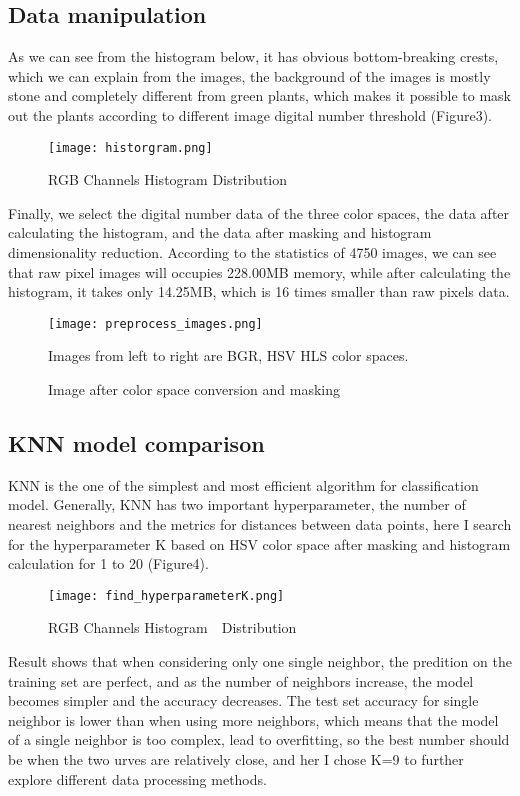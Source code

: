 \documentclass[12pt]{article}
\begin{document}
\subsection{Data manipulation}
As we can see from the histogram below, it has obvious bottom-breaking crests, which we can explain from the images, the background of the images is mostly stone and completely different from green plants, which makes it possible to mask out the plants according to different image digital number threshold (Figure3).
\begin{center}
\begin{figure}[htb]
\centering 
\texttt{[image: historgram.png]}
\caption{RGB Channels Histogram Distribution}
\end{figure}
\end{center}
Finally, we select the digital number data of the three color spaces, the data after calculating the histogram, and the data after masking and histogram dimensionality reduction. According to the statistics of 4750 images, we can see that raw pixel images will occupies 228.00MB memory, while after calculating the histogram, it takes only 14.25MB, which is 16 times smaller than raw pixels data.
\begin{center}
\begin{figure}[htb]
\centering 
\texttt{[image: preprocess\_images.png]}
\caption{Image after color space conversion and masking}
Images from left to right are BGR, HSV HLS color spaces.
\end{figure}
\end{center}

\subsection{KNN model comparison}
KNN is the one of the simplest and most efficient algorithm for classification model. Generally, KNN has two important hyperparameter, the number of nearest neighbors and the metrics for distances between data points, here I search for the hyperparameter K based on HSV color space after masking and histogram calculation for 1 to 20 (Figure4). 
\begin{center}
\begin{figure}[htb]
\centering 
\texttt{[image: find\_hyperparameterK.png]}
\caption{RGB Channels Histogram　Distribution}
\end{figure}
\end{center}
Result shows that when considering only one single neighbor, the predition on the training set are perfect, and as the number of neighbors increase, the model becomes simpler and the accuracy decreases. The test set accuracy for single neighbor is lower than when using more neighbors, which means that the model of a single neighbor is too complex, lead to overfitting, so the best number should be when the two urves are relatively close, and her I chose K=9 to further explore different data processing methods.
\end{document}
